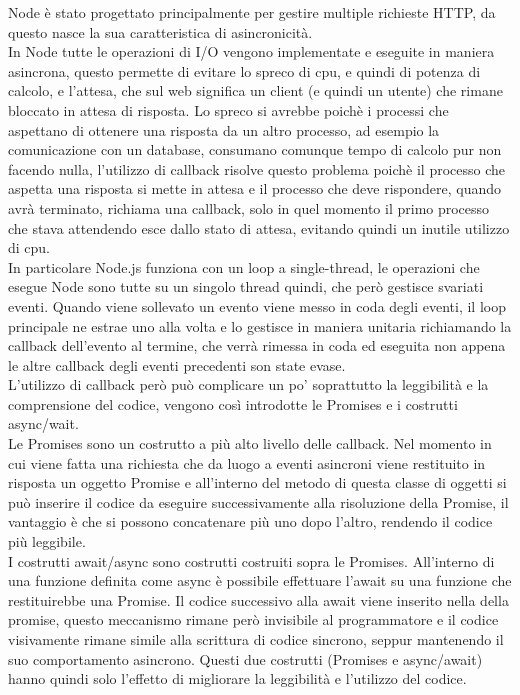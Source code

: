 \noindent
Node è stato progettato principalmente per gestire multiple richieste HTTP, da questo nasce la sua caratteristica di asincronicità.\\
In Node tutte le operazioni di I/O vengono implementate e eseguite in maniera asincrona, questo permette di evitare lo spreco di cpu, e quindi di potenza di calcolo, e l'attesa, che sul web significa un client (e quindi un utente) che rimane bloccato in attesa di risposta. Lo spreco si avrebbe poichè i processi che aspettano di ottenere una risposta da un altro processo, ad esempio la comunicazione con un database, consumano comunque tempo di calcolo pur non facendo nulla, l'utilizzo di callback risolve questo problema poichè il processo che aspetta una risposta si mette in attesa e il processo che deve rispondere, quando avrà terminato, richiama una callback, solo in quel momento il primo processo che stava attendendo esce dallo stato di attesa, evitando quindi un inutile utilizzo di cpu. \\
In particolare Node.js funziona con un loop a single-thread, le operazioni che esegue Node sono tutte su un singolo thread quindi, che però gestisce svariati eventi. Quando viene sollevato un evento viene messo in coda degli eventi, il loop principale ne estrae uno alla volta e lo gestisce in maniera unitaria richiamando la callback dell'evento al termine, che verrà rimessa in coda ed eseguita non appena le altre callback degli eventi precedenti son state evase.\\

\noindent
L'utilizzo di callback però può complicare un po' soprattutto la leggibilità e la comprensione del codice, vengono così introdotte le Promises e i costrutti async/wait.\\
Le Promises sono un costrutto a più alto livello delle callback. Nel momento in cui viene fatta una richiesta che da luogo a eventi asincroni viene restituito in risposta un oggetto Promise e all'interno del metodo  di questa classe di oggetti si può inserire il codice da eseguire successivamente alla risoluzione della Promise, il vantaggio è che si possono concatenare più  uno dopo l'altro, rendendo il codice più leggibile.\\
I costrutti await/async  sono costrutti costruiti sopra le Promises. All'interno di una funzione definita come async è possibile effettuare l'await su una funzione che restituirebbe una Promise. Il codice successivo alla await viene inserito nella  della promise, questo meccanismo rimane però invisibile al programmatore e il codice visivamente rimane simile alla scrittura di codice sincrono, seppur mantenendo il suo comportamento asincrono. Questi due costrutti (Promises e async/await) hanno quindi solo l'effetto di migliorare la leggibilità e l'utilizzo del codice.\\

